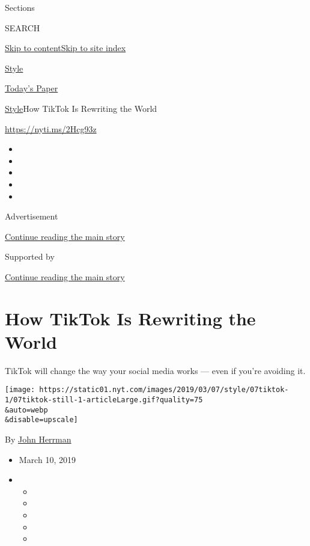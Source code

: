 Sections

SEARCH

\protect\hyperlink{site-content}{Skip to
content}\protect\hyperlink{site-index}{Skip to site index}

\href{https://www.nytimes.com/section/style}{Style}

\href{https://myaccount.nytimes.com/auth/login?response_type=cookie\&client_id=vi}{}

\href{https://www.nytimes.com/section/todayspaper}{Today's Paper}

\href{/section/style}{Style}\textbar{}How TikTok Is Rewriting the World

\url{https://nyti.ms/2Hcg93z}

\begin{itemize}
\item
\item
\item
\item
\item
\end{itemize}

Advertisement

\protect\hyperlink{after-top}{Continue reading the main story}

Supported by

\protect\hyperlink{after-sponsor}{Continue reading the main story}

\hypertarget{how-tiktok-is-rewriting-the-world}{%
\section{How TikTok Is Rewriting the
World}\label{how-tiktok-is-rewriting-the-world}}

TikTok will change the way your social media works --- even if you're
avoiding it.

\texttt{[image: https://static01.nyt.com/images/2019/03/07/style/07tiktok-1/07tiktok-still-1-articleLarge.gif?quality=75\\\&auto=webp\\\&disable=upscale]}

By \href{https://www.nytimes.com/by/john-herrman}{John Herrman}

\begin{itemize}
\item
  March 10, 2019
\item
  \begin{itemize}
  \item
  \item
  \item
  \item
  \item
  \end{itemize}
\end{itemize}

